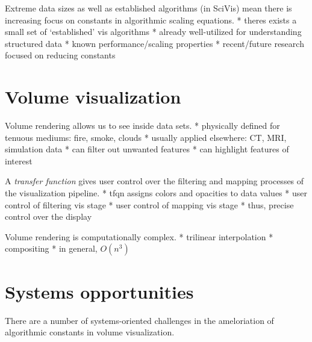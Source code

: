 
Extreme data sizes as well as established algorithms (in SciVis)
mean there is increasing focus on constants in algorithmic scaling
equations.
	* theres exists a small set of `established' vis algorithms
	* already well-utilized for understanding structured data
	* known performance/scaling properties
	* recent/future research focused on reducing constants

%
%

\section{Volume visualization}


Volume rendering allows us to see inside data sets.
	* physically defined for tenuous mediums: fire, smoke, clouds
	* usually applied elsewhere: CT, MRI, simulation data
	* can filter out unwanted features
	* can highlight features of interest


A \emph{transfer function} gives user control over the filtering and
mapping processes of the visualization pipeline.
	* tfqn assigns colors and opacities to data values
	* user control of filtering vis stage
	* user control of mapping vis stage
	* thus, precise control over the display

Volume rendering is computationally complex.
	* trilinear interpolation
	* compositing
	* in general, $O(n^3)$

\section{Systems opportunities}

There are a number of systems-oriented challenges in the ameloriation of
algorithmic constants in volume visualization.

